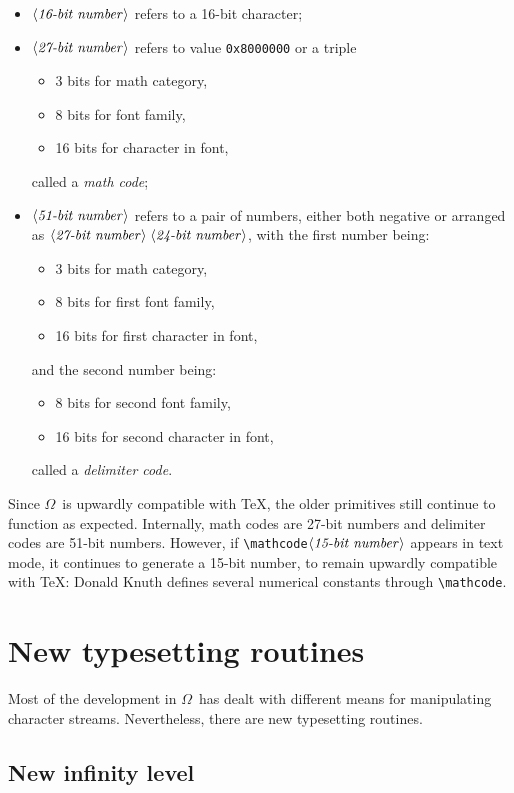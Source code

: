 \documentclass[fleqn]{article}
\newcommand{\OMEGA}{$\Omega$}
\newcommand{\bits}[1]{\langle\mbox{\emph{#1-bit number}}\rangle}
\begin{document}
\begin{itemize}
\item $\bits{16}$ refers to a 16-bit character;
\item $\bits{27}$ refers to value \texttt{0x8000000} or a triple
\begin{itemize}
\item 3 bits for math category,
\item 8 bits for font family,
\item 16 bits for character in font,
\end{itemize}
called a \emph{math code};
\item $\bits{51}$ refers to a pair of numbers, either both negative
or arranged as $\bits{27}\;\bits{24}$, with the first number being:
\begin{itemize}
\item 3 bits for math category,
\item 8 bits for first font family,
\item 16 bits for first character in font,
\end{itemize}
and the second number being:
\begin{itemize}
\item 8 bits for second font family,
\item 16 bits for second character in font,
\end{itemize}
called a \emph{delimiter code}.
\end{itemize}

Since \OMEGA\ is upwardly compatible with \TeX, the older primitives
still continue to function as expected.  Internally, math codes are
27-bit numbers and delimiter codes are 51-bit numbers.  However,
if \verb|\mathcode|$\bits{15}$ appears in text mode, it
continues to generate a 15-bit number, to remain upwardly compatible
with \TeX: Donald Knuth defines several numerical constants through
\verb|\mathcode|.

\section{New typesetting routines}

Most of the development in \OMEGA\ has dealt with different means
for manipulating character streams.  Nevertheless, there are new
typesetting routines.

\subsection{New infinity level}
\end{document}
